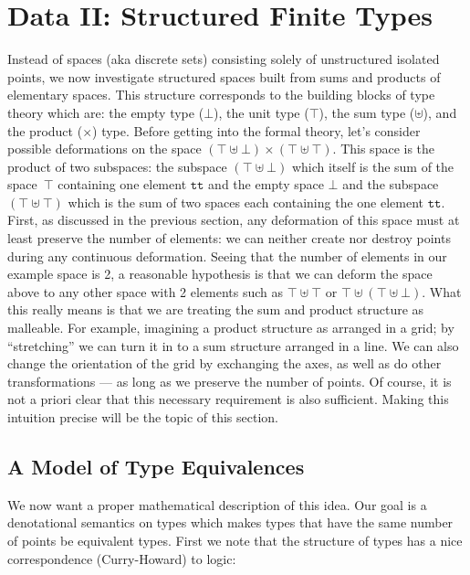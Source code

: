 \documentclass{article}
\begin{document}
\section{Data II: Structured Finite Types}
\label{sec:pi1}

Instead of spaces (aka discrete sets) consisting solely of
unstructured isolated points, we now investigate structured spaces
built from sums and products of elementary spaces. This structure
corresponds to the building blocks of type theory which are: the empty
type ($\bot$), the unit type ($\top$), the sum type ($\uplus$), and
the product ($\times$) type. Before getting into the formal theory,
let's consider possible deformations on the space $(\top \uplus \bot)
\times (\top \uplus \top)$. This space is the product of two
subspaces: the subspace $(\top \uplus \bot)$ which itself is the sum
of the space~$\top$ containing one element $\texttt{tt}$ and the empty
space $\bot$ and the subspace $(\top \uplus \top)$ which is the sum of
two spaces each containing the one element $\texttt{tt}$. First, as
discussed in the previous section, any deformation of this space must
at least preserve the number of elements: we can neither create nor
destroy points during any continuous deformation. Seeing that the
number of elements in our example space is 2, a reasonable hypothesis
is that we can deform the space above to any other space with 2
elements such as $\top \uplus \top$ or $\top \uplus (\top \uplus
\bot)$. What this really means is that we are treating the sum and
product structure as malleable. For example, imagining a product
structure as arranged in a grid; by ``stretching'' we can turn it
in to a sum structure arranged in a line. We can also change the
orientation of the grid by exchanging the axes, as well as do other
transformations --- as long as we preserve the number of points.
Of course, it is not a priori clear that this necessary requirement
is also sufficient.  Making this intuition precise will be the topic of this
section.

\subsection{A Model of Type Equivalences}

We now want a proper mathematical description of this idea. Our goal
is a denotational semantics on types which makes types that have the
same number of points be equivalent types.  First we note that the
structure of types has a nice correspondence (Curry-Howard) to logic:
\end{document}
